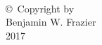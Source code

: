 
\thispagestyle{empty}
\hbox{\ }

\vfill
\renewcommand{\baselinestretch}{1}
\small\normalsize

\vspace{-.65in}

\begin{center}
\large{\copyright \hbox{ }Copyright by\\
Benjamin W. Frazier %
\\
2017}
\end{center}
\vfill